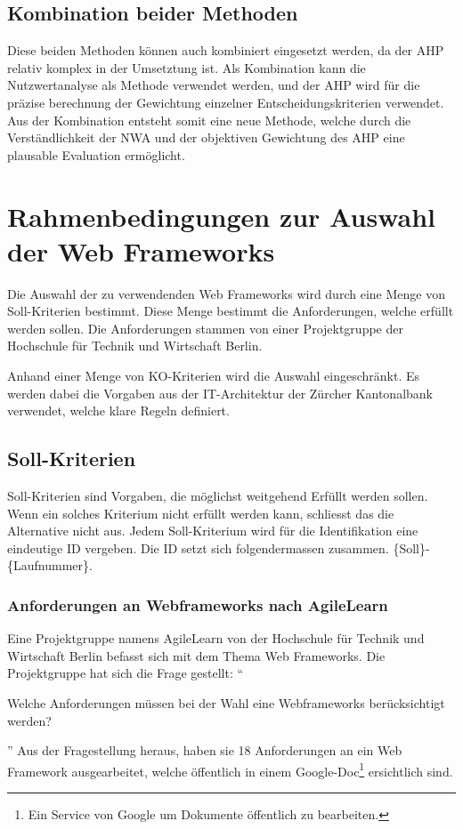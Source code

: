   \subsection{Kombination beider Methoden}
  
  Diese beiden Methoden können auch kombiniert eingesetzt
  werden\cite{AhpNwaKombination}, da der \ac{AHP} relativ komplex in der
  Umsetztung ist. Als Kombination kann die Nutzwertanalyse als Methode
  verwendet werden, und der \ac{AHP} wird für die präzise berechnung der
  Gewichtung einzelner Entscheidungskriterien verwendet. Aus der Kombination
  entsteht somit eine neue Methode, welche durch die Verständlichkeit der
  \ac{NWA} und der objektiven Gewichtung des \ac{AHP} eine plausable Evaluation
  ermöglicht.
    
  \section{Rahmenbedingungen zur Auswahl der Web Frameworks}
  
  Die Auswahl der zu verwendenden Web Frameworks wird durch eine Menge von
  Soll-Kriterien bestimmt. Diese Menge bestimmt die Anforderungen, welche
  erfüllt werden sollen. Die Anforderungen stammen von einer Projektgruppe der
  Hochschule für Technik und Wirtschaft Berlin.
  
  Anhand einer Menge von KO-Kriterien wird die Auswahl eingeschränkt. Es werden
  dabei die Vorgaben aus der IT-Architektur der Zürcher Kantonalbank verwendet,
  welche klare Regeln definiert.

  \subsection{Soll-Kriterien}
  
  Soll-Kriterien sind Vorgaben, die möglichst weitgehend Erfüllt werden sollen.
  Wenn ein solches Kriterium nicht erfüllt werden kann, schliesst das die
  Alternative nicht aus. Jedem Soll-Kriterium wird für die Identifikation eine
  eindeutige ID vergeben. Die ID setzt sich folgendermassen zusammen.
  \{Soll\}-\{Laufnummer\}.
  
  \subsubsection{Anforderungen an Webframeworks nach AgileLearn}
  
  Eine Projektgruppe namens AgileLearn von der Hochschule für Technik und
  Wirtschaft Berlin befasst sich mit dem Thema Web Frameworks. Die
  Projektgruppe hat sich die Frage gestellt: ``\begin{itshape}Welche
  Anforderungen müssen bei der Wahl eine Webframeworks berücksichtigt
  werden?\end{itshape}'' Aus der Fragestellung heraus, haben sie 18
  Anforderungen an ein Web Framework ausgearbeitet, welche öffentlich in einem
  Google-Doc\footnote{Ein Service von Google um Dokumente öffentlich zu
  bearbeiten.} ersichtlich sind.
  
